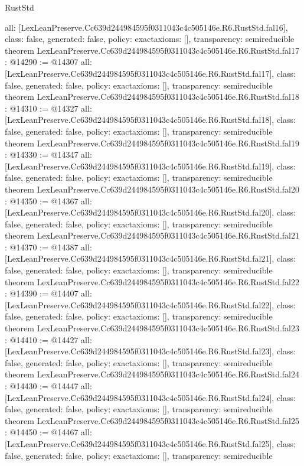 \begin{lexlean}{RustStd}
\begin{coremodule}
{  all: [LexLeanPreserve.Cc639d244984595f0311043c4c505146e.R6.RustStd.fal16],
  class: false,
  generated: false,
  policy: exact{axioms: []},
  transparency: semireducible
}
theorem LexLeanPreserve.Cc639d244984595f0311043c4c505146e.R6.RustStd.fal17 : @14290 := @14307 {
  all: [LexLeanPreserve.Cc639d244984595f0311043c4c505146e.R6.RustStd.fal17],
  class: false,
  generated: false,
  policy: exact{axioms: []},
  transparency: semireducible
}
theorem LexLeanPreserve.Cc639d244984595f0311043c4c505146e.R6.RustStd.fal18 : @14310 := @14327 {
  all: [LexLeanPreserve.Cc639d244984595f0311043c4c505146e.R6.RustStd.fal18],
  class: false,
  generated: false,
  policy: exact{axioms: []},
  transparency: semireducible
}
theorem LexLeanPreserve.Cc639d244984595f0311043c4c505146e.R6.RustStd.fal19 : @14330 := @14347 {
  all: [LexLeanPreserve.Cc639d244984595f0311043c4c505146e.R6.RustStd.fal19],
  class: false,
  generated: false,
  policy: exact{axioms: []},
  transparency: semireducible
}
theorem LexLeanPreserve.Cc639d244984595f0311043c4c505146e.R6.RustStd.fal20 : @14350 := @14367 {
  all: [LexLeanPreserve.Cc639d244984595f0311043c4c505146e.R6.RustStd.fal20],
  class: false,
  generated: false,
  policy: exact{axioms: []},
  transparency: semireducible
}
theorem LexLeanPreserve.Cc639d244984595f0311043c4c505146e.R6.RustStd.fal21 : @14370 := @14387 {
  all: [LexLeanPreserve.Cc639d244984595f0311043c4c505146e.R6.RustStd.fal21],
  class: false,
  generated: false,
  policy: exact{axioms: []},
  transparency: semireducible
}
theorem LexLeanPreserve.Cc639d244984595f0311043c4c505146e.R6.RustStd.fal22 : @14390 := @14407 {
  all: [LexLeanPreserve.Cc639d244984595f0311043c4c505146e.R6.RustStd.fal22],
  class: false,
  generated: false,
  policy: exact{axioms: []},
  transparency: semireducible
}
theorem LexLeanPreserve.Cc639d244984595f0311043c4c505146e.R6.RustStd.fal23 : @14410 := @14427 {
  all: [LexLeanPreserve.Cc639d244984595f0311043c4c505146e.R6.RustStd.fal23],
  class: false,
  generated: false,
  policy: exact{axioms: []},
  transparency: semireducible
}
theorem LexLeanPreserve.Cc639d244984595f0311043c4c505146e.R6.RustStd.fal24 : @14430 := @14447 {
  all: [LexLeanPreserve.Cc639d244984595f0311043c4c505146e.R6.RustStd.fal24],
  class: false,
  generated: false,
  policy: exact{axioms: []},
  transparency: semireducible
}
theorem LexLeanPreserve.Cc639d244984595f0311043c4c505146e.R6.RustStd.fal25 : @14450 := @14467 {
  all: [LexLeanPreserve.Cc639d244984595f0311043c4c505146e.R6.RustStd.fal25],
  class: false,
  generated: false,
  policy: exact{axioms: []},
  transparency: semireducible
}
\end{coremodule}
\end{lexlean}
